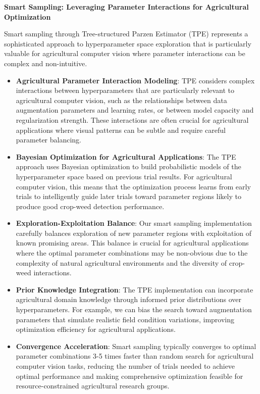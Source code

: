\textbf{Smart Sampling: Leveraging Parameter Interactions for Agricultural Optimization}

Smart sampling through Tree-structured Parzen Estimator (TPE) represents a sophisticated approach to hyperparameter space exploration that is particularly valuable for agricultural computer vision where parameter interactions can be complex and non-intuitive.

\begin{itemize}
    \item \textbf{Agricultural Parameter Interaction Modeling}: TPE considers complex interactions between hyperparameters that are particularly relevant to agricultural computer vision, such as the relationships between data augmentation parameters and learning rates, or between model capacity and regularization strength. These interactions are often crucial for agricultural applications where visual patterns can be subtle and require careful parameter balancing.
    
    \item \textbf{Bayesian Optimization for Agricultural Applications}: The TPE approach uses Bayesian optimization to build probabilistic models of the hyperparameter space based on previous trial results. For agricultural computer vision, this means that the optimization process learns from early trials to intelligently guide later trials toward parameter regions likely to produce good crop-weed detection performance.
    
    \item \textbf{Exploration-Exploitation Balance}: Our smart sampling implementation carefully balances exploration of new parameter regions with exploitation of known promising areas. This balance is crucial for agricultural applications where the optimal parameter combinations may be non-obvious due to the complexity of natural agricultural environments and the diversity of crop-weed interactions.
    
    \item \textbf{Prior Knowledge Integration}: The TPE implementation can incorporate agricultural domain knowledge through informed prior distributions over hyperparameters. For example, we can bias the search toward augmentation parameters that simulate realistic field condition variations, improving optimization efficiency for agricultural applications.
    
    \item \textbf{Convergence Acceleration}: Smart sampling typically converges to optimal parameter combinations 3-5 times faster than random search for agricultural computer vision tasks, reducing the number of trials needed to achieve optimal performance and making comprehensive optimization feasible for resource-constrained agricultural research groups.
\end{itemize}

